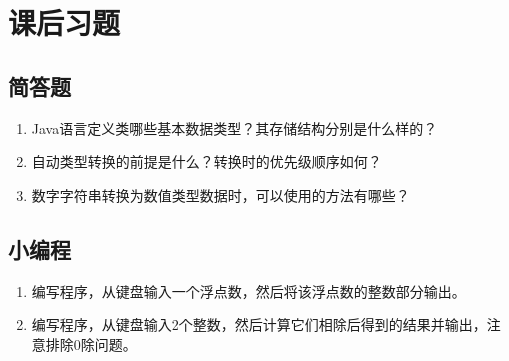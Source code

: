 \section{课后习题}

\subsection{简答题}
\begin{enumerate}
\item Java语言定义类哪些基本数据类型？其存储结构分别是什么样的？
\item 自动类型转换的前提是什么？转换时的优先级顺序如何？
\item 数字字符串转换为数值类型数据时，可以使用的方法有哪些？
\end{enumerate}

\subsection{小编程}
\begin{enumerate}
\item 编写程序，从键盘输入一个浮点数，然后将该浮点数的整数部分输出。
\item 编写程序，从键盘输入2个整数，然后计算它们相除后得到的结果并输出，注意排除0除问题。
\end{enumerate}